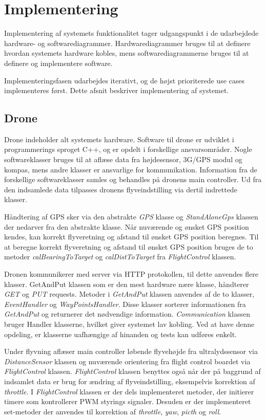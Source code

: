 \section{Implementering}
Implementering af systemets funktionalitet tager udgangspunkt i de udarbejdede hardware- og softwarediagrammer. Hardwarediagrammer bruges til at definere hvordan systemets hardware kobles, mens softwarediagrammerne bruges til at definere og implementere software.

Implementeringsfasen udarbejdes iterativt, og de højst prioriterede use cases implementeres først. 
Dette afsnit beskriver implementering af systemet.

\subsection{Drone}
Drone indeholder alt systemets hardware. Software til drone er udviklet i programmerings sproget C++, og er opdelt i forskellige ansvarsområder. Nogle softwareklasser bruges til at aflæse data fra højdesensor, 3G/GPS modul og kompas, mens andre klasser er ansvarlige for kommunikation. Information fra de forskellige softwareklasser samles og behandles på dronens main controller. Ud fra den indsamlede data tilpasses dronens flyveindstilling via dertil indrettede klasser. 

Håndtering af GPS sker via den abstrakte \textit{GPS} klasse og \textit{StandAloneGps} klassen der nedarver fra den abstrakte klasse. Når nuværende og ønsket GPS position kendes, kan korrekt flyveretning og afstand til ønsket GPS position beregnes. Til at beregne korrekt flyveretning og afstand til ønsket GPS position bruges de to metoder \textit{calBearingToTarget} og \textit{calDistToTarget} fra \textit{FlightControl} klassen. 

Dronen kommunikerer med server via HTTP protokollen, til dette anvendes flere klasser. GetAndPut klassen som er den mest hardware nære klasse, håndterer \textit{GET} og \textit{PUT} requests. Metoder i \textit{GetAndPut} klassen anvendes af de to klasser, \textit{EventHandler} og \textit{WayPointsHandler}. Disse klasser sorterer informationen fra \textit{GetAndPut} og returnerer det nødvendige information. \textit{Communication} klassen bruger Handler klasserne, hvilket giver systemet lav kobling. Ved at have denne opdeling, er klasserne uafhængige af hinanden og tests kan udføres enkelt.

Under flyvning aflæser main controller løbende flyvehøjde fra ultralydssensor via \textit{DistanceSensor} klassen og nuværende orientering fra flight control boardet via \textit{FlightControl} klassen. \textit{FlightControl} klassen benyttes også når der på baggrund af indsamlet data er brug for ændring af flyveindstilling, eksempelvis korrektion af \textit{throttle}. I \textit{FlightControl} klassen er der dels implementeret metoder, der initierer timere som kontrollerer PWM styrings signaler. Desuden er der implementeret set-metoder der anvendes til korrektion af \textit{throttle}, \textit{yaw}, \textit{picth} og \textit{roll}.  

